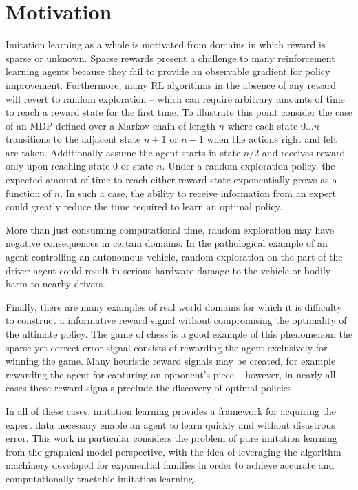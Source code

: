 \documentclass{article} %
\begin{document}
\section{Motivation}
Imitation learning as a whole is motivated from domains in which reward is
sparse or unknown. Sparse rewards present a challenge to many reinforcement
learning agents because they fail to provide an observable gradient for policy
improvement. Furthermore, many RL algorithms in the absence of any reward will
revert to random exploration -- which can require arbitrary amounts of time to
reach a reward state for the first time. To illustrate this point consider the
case of an MDP defined over a Markov chain of length $n$ where each state
$0...n$ transitions to the adjacent state $n+1$ or $n-1$ when the actions right
and left are taken. Additionally assume the agent starts in state $n/2$ and
receives reward only upon reaching state $0$ or state $n$. Under a random
exploration policy, the expected amount of time to reach either reward state
exponentially grows as a function of $n$. In such a case, the ability to
receive information from an expert could greatly reduce the time required to
learn an optimal policy. 

More than just consuming computational time, random exploration may have
negative consequences in certain domains. In the pathological example of an
agent controlling an autonomous vehicle, random exploration on the part of the
driver agent could result in serious hardware damage to the vehicle or bodily
harm to nearby drivers.

Finally, there are many examples of real world domains for which it is
difficulty to construct a informative reward signal without compromising the
optimality of the ultimate policy. The game of chess is a good example of this
phenomenon: the sparse yet correct error signal consists of rewarding the agent
exclusively for winning the game. Many heuristic reward signals may be created,
for example rewarding the agent for capturing an opponent's piece -- however,
in nearly all cases these reward signals preclude the discovery of optimal
policies.

In all of these cases, imitation learning provides a framework for acquiring
the expert data necessary enable an agent to learn quickly and without
disastrous error. This work in particular considers the problem of pure
imitation learning from the graphical model perspective, with the idea of
leveraging the algorithm machinery developed for exponential families in order
to achieve accurate and computationally tractable imitation learning.
\end{document}
